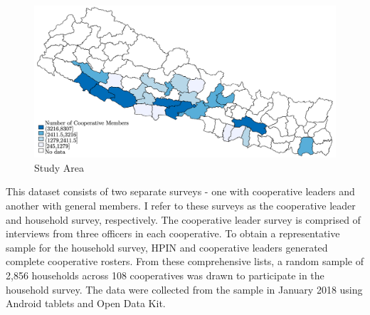 \documentclass[11pt]{article}
\begin{document}
\begin{figure}[!h]
    \caption{Study Area}
    \label{map}
    \noindent \centering \includegraphics[width=.9\textwidth,trim=4 4 4 4,clip]{StudyMap.png}
\end{figure}

This dataset consists of two separate surveys - one with cooperative leaders and another with general members.  %
I refer to these surveys as the cooperative leader and household survey, respectively. The cooperative leader survey is comprised of interviews from three officers in each cooperative. To obtain a representative sample for the household survey, HPIN and cooperative leaders generated complete cooperative rosters. From these comprehensive lists, a random sample of 2,856 households across 108 %
cooperatives was drawn to participate in the household survey. The data were collected from the sample in January 2018 using Android tablets and Open Data Kit.
\end{document}
